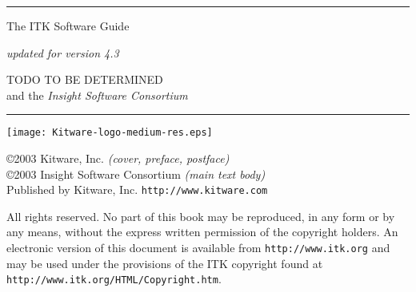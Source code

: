 
\begin{minipage}[t][3cm][b]{\textwidth}
\rule{14cm}{1pt}
\end{minipage}


\begin{minipage}[t][3cm][b]{\textwidth}
\Huge
The ITK Software Guide\\
\normalsize
\par
\emph{updated for version 4.3}\\
\end{minipage}

\hfill
\begin{minipage}[t][6cm][b]{0.6\textwidth}
\Large
\renewcommand{\baselinestretch}{1.5}
TODO TO BE DETERMINED \\
and the \emph{Insight Software Consortium}
\normalsize
\end{minipage}


\begin{minipage}[t][2cm][b]{\textwidth}
\rule{14cm}{1pt}
\end{minipage}

\newpage

\begin{minipage}[t][4cm][b]{\textwidth}
\begin{center}
\texttt{[image: Kitware-logo-medium-res.eps]}
\end{center}
\par
\begin{center}
\large
\copyright 2003 Kitware, Inc. \emph{(cover, preface, postface)}\\
\copyright 2003 Insight Software Consortium \emph{(main text body)}\\
Published by Kitware, Inc. \texttt{http://www.kitware.com}
\normalsize
\end{center}
\end{minipage}


\begin{minipage}[t][2.25cm][b]{\textwidth}
\begin{center}
All rights reserved. No part of this book may be reproduced, in any form 
or by any means, without the express written permission of the copyright
holders. An electronic version of this document is available from
\texttt{http://www.itk.org} and may be used under the provisions of the
ITK copyright found at \texttt{http://www.itk.org/HTML/Copyright.htm}.
\end{center}
\end{minipage}


